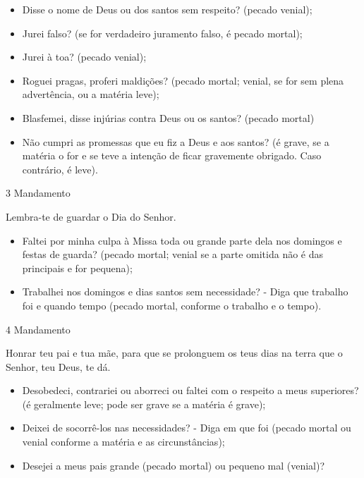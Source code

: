 \begin{itemize}
    \item Disse o nome de Deus ou dos santos sem respeito? (pecado venial);
    \item Jurei falso? (se for verdadeiro juramento falso, é pecado mortal);
    \item Jurei à toa? (pecado venial);
    \item Roguei pragas, proferi maldições? (pecado mortal; venial, se for sem plena advertência, ou a matéria leve);
    \item Blasfemei, disse injúrias contra Deus ou os santos? (pecado mortal)
    \item Não cumpri as promessas que eu fiz a Deus e aos santos? (é grave, se a matéria o for e se teve a intenção de ficar gravemente obrigado. Caso contrário, é leve).
\end{itemize}
\begin{center}
    3\textordmasculine{} Mandamento
\end{center}
\begin{flushleft}
    Lembra-te de guardar o Dia do Senhor.
\end{flushleft}
\begin{itemize}
    \item Faltei por minha culpa à Missa toda ou grande parte dela nos domingos e festas de guarda? (pecado mortal; venial se a parte omitida não é das principais e for pequena);
    \item Trabalhei nos domingos e dias santos sem necessidade? - Diga que trabalho foi e quando tempo (pecado mortal, conforme o trabalho e o tempo).
\end{itemize}
\newpage
\begin{center}
    4\textordmasculine{} Mandamento
\end{center}
\begin{flushleft}
    Honrar teu pai e tua mãe, para que se prolonguem os teus dias na terra que o Senhor, teu Deus, te dá.
\end{flushleft}
\begin{itemize}
    \item Desobedeci, contrariei ou aborreci ou faltei com o respeito a meus superiores? (é geralmente leve; pode ser grave se a matéria é grave);
    \item Deixei de socorrê-los nas necessidades? - Diga em que foi (pecado mortal ou venial conforme a matéria e as circunstâncias);
    \item Desejei a meus pais grande (pecado mortal) ou pequeno mal (venial)?
\end{itemize}
